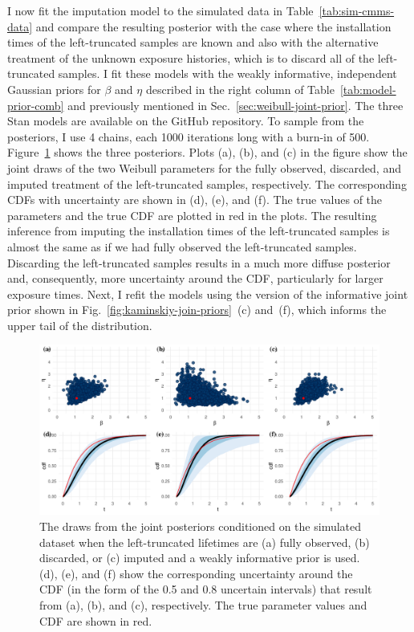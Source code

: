 I now fit the imputation model to the simulated data in Table~\ref{tab:sim-cmms-data} and compare the resulting posterior with the case where the installation times of the left-truncated samples are known and also with the alternative treatment of the unknown exposure histories, which is to discard all of the left-truncated samples. I fit these models with the weakly informative, independent Gaussian priors for $\beta$ and $\eta$ described in the right column of Table~\ref{tab:model-prior-comb} and previously mentioned in Sec.~\ref{sec:weibull-joint-prior}. The three Stan models are available on the GitHub repository. To sample from the posteriors, I use 4 chains, each 1000 iterations long with a burn-in of 500. Figure~\ref{fig:joint-post-weibull} shows the three posteriors. Plots (a), (b), and (c) in the figure show the joint draws of the two Weibull parameters for the fully observed, discarded, and imputed treatment of the left-truncated samples, respectively. The corresponding CDFs with uncertainty are shown in (d), (e), and (f). The true values of the parameters and the true CDF are plotted in red in the plots. The resulting inference from imputing the installation times of the left-truncated samples is almost the same as if we had fully observed the left-truncated samples. Discarding the left-truncated samples results in a much more diffuse posterior and, consequently, more uncertainty around the CDF, particularly for larger exposure times. Next, I refit the models using the version of the informative joint prior shown in Fig.~\ref{fig:kaminskiy-join-priors}~(c) and~(f), which informs the upper tail of the distribution.

\begin{figure}
    \centering
    \includegraphics[width=1\textwidth]{./figures/ch-2/joint-posts.pdf}
    \caption{The draws from the joint posteriors conditioned on the simulated dataset when the left-truncated lifetimes are (a) fully observed, (b) discarded, or (c) imputed and a weakly informative prior is used. (d), (e), and (f) show the corresponding uncertainty around the CDF (in the form of the 0.5 and 0.8 uncertain intervals) that result from (a), (b), and (c), respectively. The true parameter values and CDF are shown in red.}
    \label{fig:joint-post-weibull}
\end{figure}

